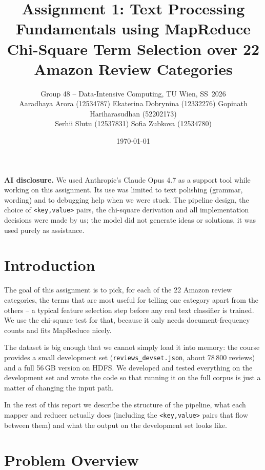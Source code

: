 \documentclass[11pt,a4paper]{article}
\title{\vspace{-1cm}Assignment 1: Text Processing Fundamentals using MapReduce\\
       \large Chi-Square Term Selection over 22 Amazon Review Categories}
\author{
Group 48 -- Data-Intensive Computing, TU Wien, SS~2026\\[2pt]
\small
Aaradhaya Arora (12534787) \quad
Ekaterina Dobrynina (12332276) \quad
Gopinath Hariharasudhan (52202173) \\[1pt]
\small
Serhii Slutu (12537831) \quad
Sofia Zubkova (12534780)
}
\date{\today}
\begin{document}
\maketitle

\vspace{-0.4cm}

\noindent\textbf{AI disclosure.}
We used Anthropic's Claude Opus 4.7 as a support tool while working on this
assignment. Its use was limited to text polishing (grammar, wording) and to
debugging help when we were stuck. The pipeline design, the choice of
\texttt{<key,value>} pairs, the chi-square derivation and all
implementation decisions were made by us; the model did not generate ideas
or solutions, it was used purely as assistance.

\vspace{0.2cm}

\section{Introduction}

The goal of this assignment is to pick, for each of the 22 Amazon review
categories, the terms that are most useful for telling one category apart
from the others -- a typical feature selection step before any real text
classifier is trained. We use the chi-square test for that, because it
only needs document-frequency counts and fits MapReduce nicely.

The dataset is big enough that we cannot simply load it into memory: the
course provides a small development set (\texttt{reviews\_devset.json},
about 78\,800 reviews) and a full 56\,GB version on HDFS. We developed
and tested everything on the development set and wrote the code so that
running it on the full corpus is just a matter of changing the input
path.

In the rest of this report we describe the structure of the pipeline,
what each mapper and reducer actually does (including the
\texttt{<key,value>} pairs that flow between them) and what the output
on the development set looks like.

\section{Problem Overview}
\end{document}
